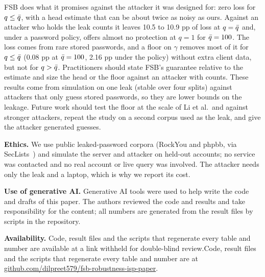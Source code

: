 FSB does what it promises against the attacker it was designed for: zero loss for $q\le\bar q$, with a head estimate that can be about twice as noisy as ours. Against an attacker who holds the leak counts it leaves 10.5 to 10.9 pp of loss at $q=\bar q$ and, under a password policy, offers almost no protection at $q=1$ for $\bar q=100$. The loss comes from rare stored passwords, and a floor on $\gamma$ removes most of it for $q\le\bar q$ (0.08 pp at $\bar q=100$, 2.16 pp under the policy) without extra client data, but not for $q>\bar q$. Practitioners should state FSB's guarantee relative to the estimate and size the head or the floor against an attacker with counts. These results come from simulation on one leak (stable over four splits) against attackers that only guess stored passwords, so they are lower bounds on the leakage. Future work should test the floor at the scale of Li et al.\ and against stronger attackers, repeat the study on a second corpus used as the leak, and give the attacker generated guesses.

\textbf{Ethics.} We use public leaked-password corpora (RockYou and phpbb, via SecLists~\cite{miessler}) and simulate the server and attacker on held-out accounts; no service was contacted and no real account or live query was involved. The attacker needs only the leak and a laptop, which is why we report its cost.

\textbf{Use of generative AI.} Generative AI tools were used to help write the code and drafts of this paper. The authors reviewed the code and results and take responsibility for the content; all numbers are generated from the result files by scripts in the repository.

\textbf{Availability.} \ifblind Code, result files and the scripts that regenerate every table and number are available at a link withheld for double-blind review.\else Code, result files and the scripts that regenerate every table and number are at \url{github.com/dilpreet579/fsb-robustness-isp-paper}.\fi





